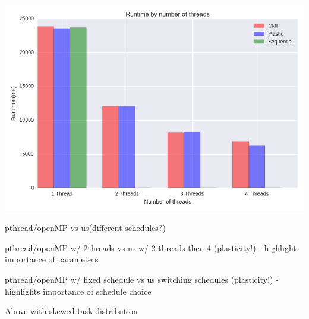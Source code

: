 \section{}


\includegraphics[width=1\textwidth]{graphics/runtime_by_number_of_threads.png}

pthread/openMP vs us(different schedules?)

pthread/openMP w/ 2threads vs us w/ 2 threads then 4 (plasticity!)       - highlights importance of parameters

pthread/openMP w/ fixed schedule vs us switching schedules (plasticity!) - highlights importance of schedule choice

 Above with skewed task distribution